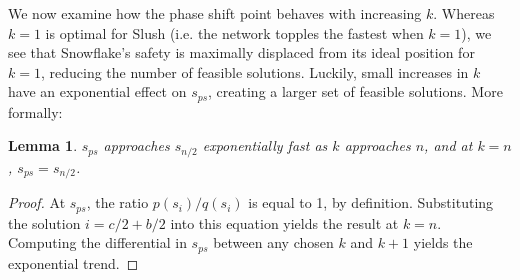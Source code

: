 \documentclass[letterpaper,twocolumn,10pt]{article}
\newcommand{\tronly}[2]{#1}
\newtheorem{lemma}[theorem]{Lemma}
\theoremstyle{definition}
\newcommand{\Jon}[1]{{\color{blue} \textbf{Jon: } #1}}
\begin{document}
\begin{appendices}

We now examine how the phase shift point behaves with increasing $k$. %
Whereas $k=1$ is optimal for Slush (i.e. the network topples the fastest when $k = 1$), we see that Snowflake's safety is maximally displaced from its ideal position for $k=1$, reducing the number of feasible solutions.
Luckily, small increases in $k$ have an exponential effect on $s_{ps}$, creating a larger set of feasible solutions. More formally: 
\begin{lemma}
$s_{ps}$ approaches $s_{n/2}$ exponentially fast as $k$ approaches $n$, and at $k = n$, $s_{ps} = s_{n/2}$.
\end{lemma}
\begin{proof}
At $s_{ps}$, the ratio $p(s_i)/q(s_i)$ is equal to 1, by definition. Substituting the solution $i = c/2 + b/2$ into this equation yields the result at $k=n$.
Computing the differential in $s_{ps}$ between any chosen $k$ and $k+1$ yields the exponential trend.
\end{proof}






\end{appendices}
\end{document}
